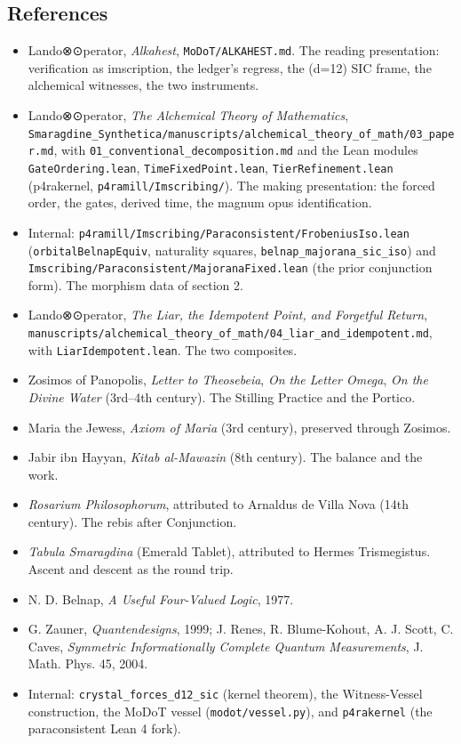 \hypertarget{references}{%
\subsection{References}\label{references}}

\begin{itemize}
\tightlist
\item
  Lando⊗⊙perator, \emph{Alkahest}, \texttt{MoDoT/ALKAHEST.md}. The
  reading presentation: verification as imscription, the ledger's
  regress, the (d=12) SIC frame, the alchemical witnesses, the two
  instruments.
\item
  Lando⊗⊙perator, \emph{The Alchemical Theory of Mathematics},
  \texttt{Smaragdine\_Synthetica/manuscripts/alchemical\_theory\_of\_math/03\_paper.md},
  with \texttt{01\_conventional\_decomposition.md} and the Lean modules
  \texttt{GateOrdering.lean}, \texttt{TimeFixedPoint.lean},
  \texttt{TierRefinement.lean} (p4rakernel,
  \texttt{p4ramill/Imscribing/}). The making presentation: the forced
  order, the gates, derived time, the magnum opus identification.
\item
  Internal:
  \texttt{p4ramill/Imscribing/Paraconsistent/FrobeniusIso.lean}
  (\texttt{orbitalBelnapEquiv}, naturality squares,
  \texttt{belnap\_majorana\_sic\_iso}) and
  \texttt{Imscribing/Paraconsistent/MajoranaFixed.lean} (the prior
  conjunction form). The morphism data of section 2.
\item
  Lando⊗⊙perator, \emph{The Liar, the Idempotent Point, and Forgetful
  Return},
  \texttt{manuscripts/alchemical\_theory\_of\_math/04\_liar\_and\_idempotent.md},
  with \texttt{LiarIdempotent.lean}. The two composites.
\item
  Zosimos of Panopolis, \emph{Letter to Theosebeia}, \emph{On the Letter
  Omega}, \emph{On the Divine Water} (3rd--4th century). The Stilling
  Practice and the Portico.
\item
  Maria the Jewess, \emph{Axiom of Maria} (3rd century), preserved
  through Zosimos.
\item
  Jabir ibn Hayyan, \emph{Kitab al-Mawazin} (8th century). The balance
  and the work.
\item
  \emph{Rosarium Philosophorum}, attributed to Arnaldus de Villa Nova
  (14th century). The rebis after Conjunction.
\item
  \emph{Tabula Smaragdina} (Emerald Tablet), attributed to Hermes
  Trismegistus. Ascent and descent as the round trip.
\item
  N. D. Belnap, \emph{A Useful Four-Valued Logic}, 1977.
\item
  G. Zauner, \emph{Quantendesigns}, 1999; J. Renes, R. Blume-Kohout, A.
  J. Scott, C. Caves, \emph{Symmetric Informationally Complete Quantum
  Measurements}, J. Math. Phys. 45, 2004.
\item
  Internal: \texttt{crystal\_forces\_d12\_sic} (kernel theorem), the
  Witness-Vessel construction, the MoDoT vessel
  (\texttt{modot/vessel.py}), and \texttt{p4rakernel} (the
  paraconsistent Lean 4 fork).
\end{itemize}
